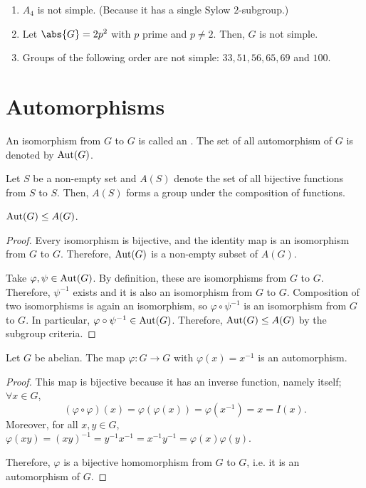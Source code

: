 \documentclass[11pt]{penrose}
\begin{document}
\begin{nex}\phantom{}
    \begin{enumerate}
        \item $A_{4}$ is not simple. (Because it has a single Sylow $2$-subgroup.)
        \item Let $\abs{G} = 2 p^{2}$ with $p$ prime and $p \neq 2$. Then, $G$ is not simple.
        \item Groups of the following order are not simple: $33, 51, 56, 65, 69$ and $100$.
    \end{enumerate}
\end{nex}

\section{Automorphisms}

\begin{ndfn}[Automorphism]
    An isomorphism from $G$ to $G$ is called an . The set of all automorphism of $G$ is denoted by $\operatorname{Aut}(G)$.
\end{ndfn}

Let $S$ be a non-empty set and $A(S)$ denote the set of all bijective functions from $S$ to $S$. Then, $A(S)$ forms a group under the composition of functions.

\begin{nprop}
    $\operatorname{Aut}(G) \mathrel{\leq} A(G)$.
\end{nprop}
\begin{proof}
    Every isomorphism is bijective, and the identity map is an isomorphism from $G$ to $G$. Therefore, $\operatorname{Aut}(G)$ is a non-empty subset of $A(G)$.

    Take $\varphi, \psi \in \operatorname{Aut}(G)$. By definition, these are isomorphisms from $G$ to $G$. Therefore, $\psi^{-1}$ exists and it is also an isomorphism from $G$ to $G$. Composition of two isomorphisms is again an isomorphism, so $\varphi \circ \psi^{-1}$ is an isomorphism from $G$ to $G$. In particular, $\varphi \circ \psi^{-1} \in \operatorname{Aut}(G)$. Therefore, $\operatorname{Aut}(G) \mathrel{\leq} A(G)$ by the subgroup criteria.
\end{proof}

\begin{nprop}
    Let $G$ be abelian. The map $\varphi: G \to G$ with $\varphi(x) = x^{-1}$ is an automorphism.
\end{nprop}
\begin{proof}
    This map is bijective because it has an inverse function, namely itself; $\forall x \in G$,
    \begin{equation*}
        (\varphi \circ \varphi) (x) = \varphi( \varphi(x) ) = \varphi( x^{-1} ) = x = I(x).
    \end{equation*}
    Moreover, for all $x, y \in G$, $\varphi(xy) = (xy)^{-1} = y^{-1} x^{-1} = x^{-1} y^{-1} = \varphi(x) \varphi(y)$.

    Therefore, $\varphi$ is a bijective homomorphism from $G$ to $G$, i.e. it is an automorphism of $G$.
\end{proof}
\end{document}
